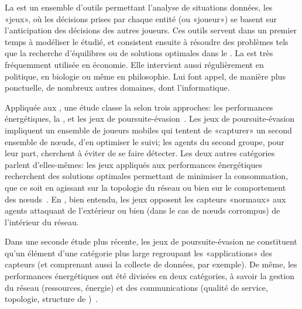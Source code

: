 La  est un ensemble d'outils permettant l'analyse de situations données, les «jeux», où les décisions prises par chaque entité (ou «joueur») se basent sur l'anticipation des décisions des autres joueurs.
Ces outils servent dans un premier temps à modéliser le  étudié, et consistent ensuite à résoudre des problèmes tels que la recherche d'équilibres ou de solutions optimales dans le .
La  est très fréquemment utilisée en économie.
Elle intervient aussi régulièrement en politique, en biologie ou même en philosophie.
Lui font appel, de manière plus ponctuelle, de nombreux autres domaines, dont l'informatique.

Appliquée aux \rcs, une étude classe la  selon trois approches: les performances énergétiques, la \secu, et les jeux de poursuite-évasion~\cite{MT08}.
Les jeux de poursuite-évasion impliquent un ensemble de joueurs mobiles qui tentent de «capturer» un second ensemble de nœuds, d'en optimiser le suivi; les agents du second groupe, pour leur part, cherchent à éviter de se faire détecter.
Les deux autres catégories parlent d'elles-mêmes: les jeux appliqués aux performances énergétiques recherchent des solutions optimales permettant de minimiser la consommation, que ce soit en agissant sur la topologie du réseau ou bien sur le comportement des nœuds~\cite{CPF09}.
En \secu, bien entendu, les jeux opposent les capteurs «normaux» aux agents attaquant de l'extérieur ou bien (dans le cas de nœuds corrompus) de l'intérieur du réseau.

Dans une seconde étude plus récente, les jeux de poursuite-évasion ne constituent qu'un élément d'une catégorie plus large regroupant les «applications» des capteurs (et comprenant aussi la collecte de données, par exemple).
De même, les performances énergétiques ont été divisées en deux catégories, à savoir la gestion du réseau (ressources, énergie) et des communications (qualité de service, topologie, structure de )~\cite{SWKC12}.

